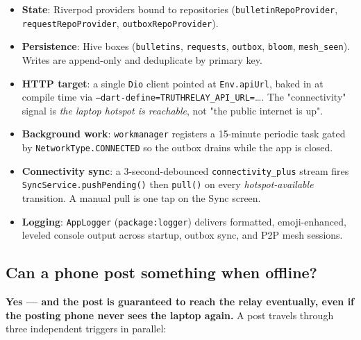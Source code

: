 \documentclass[11pt,a4paper]{article}
\begin{document}
\begin{itemize}[leftmargin=*]
  \item \textbf{State}: Riverpod providers bound to repositories
        (\texttt{bulletinRepoProvider},
        \texttt{requestRepoProvider}, \texttt{outboxRepoProvider}).
  \item \textbf{Persistence}: Hive boxes
        (\texttt{bulletins}, \texttt{requests}, \texttt{outbox},
        \texttt{bloom}, \texttt{mesh\_seen}). Writes are
        append-only and deduplicate by primary key.
  \item \textbf{HTTP target}: a single \texttt{Dio} client pointed at
        \texttt{Env.apiUrl}, baked in at compile time via
        \texttt{--dart-define=TRUTHRELAY\_API\_URL=}\ldots. The
        "connectivity" signal is \emph{the laptop hotspot is
        reachable}, not "the public internet is up".
  \item \textbf{Background work}: \texttt{workmanager} registers a
        15-minute periodic task gated by \texttt{NetworkType.CONNECTED}
        so the outbox drains while the app is closed.
  \item \textbf{Connectivity sync}: a 3-second-debounced
        \texttt{connectivity\_plus} stream fires
        \texttt{SyncService.pushPending()} then
        \texttt{pull()} on every \emph{hotspot-available}
        transition. A manual pull is one tap on the Sync screen.
  \item \textbf{Logging}: \texttt{AppLogger}
        (\texttt{package:logger}) delivers formatted, emoji-enhanced,
        leveled console output across startup, outbox sync, and P2P
        mesh sessions.
\end{itemize}

\subsection{Can a phone post something when offline?}
\label{sec:offline-post}

\textbf{Yes --- and the post is guaranteed to reach the relay
eventually, even if the posting phone never sees the laptop again.}
A post travels through three independent triggers in parallel:
\end{document}

